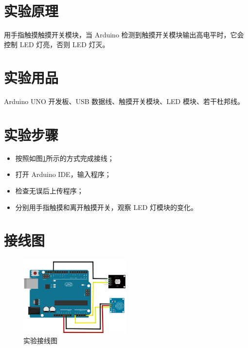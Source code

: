 \documentclass[UTF8, oneside]{ctexbook}
\begin{document}
\section{实验原理}
\paragraph{}
用手指触摸触摸开关模块，当 Arduino 检测到触摸开关模块输出高电平时，它会
控制 LED 灯亮，否则 LED 灯灭。

\section{实验用品}
\paragraph{}
Arduino UNO 开发板、USB 数据线、触摸开关模块、LED 模块、若干杜邦线。

\section{实验步骤}
\begin{itemize}
    \item[(1)] 按照如图\ref{s7_line}所示的方式完成接线；
    \item[(2)] 打开 Arduino IDE，输入程序；
    \item[(3)] 检查无误后上传程序；
    \item[(4)] 分别用手指触摸和离开触摸开关，观察 LED 灯模块的变化。
\end{itemize}

\section{接线图}
\begin{figure}[h]
    \centering
    \includegraphics[width=0.5\textwidth]{./result/sensor/7/lines.png}
    \caption{实验接线图}
    \label{s7_line}
\end{figure}
\end{document}

